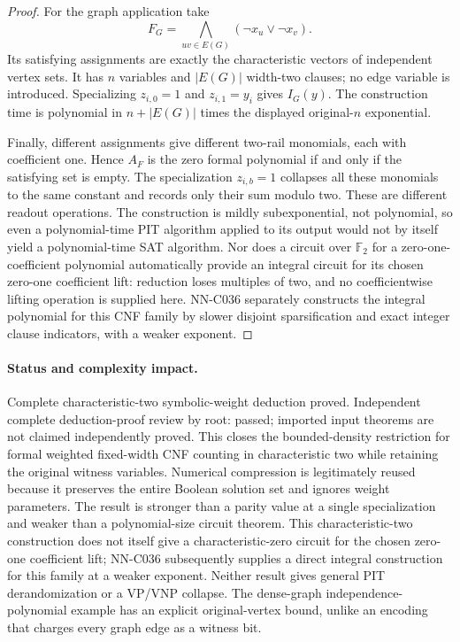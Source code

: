 \begin{proof}
For the graph application take
\[
                         F_G=\bigwedge_{uv\in E(G)}(\neg x_u\vee\neg x_v).
\]
Its satisfying assignments are exactly the characteristic vectors of independent vertex sets. It has $n$ variables and $|E(G)|$ width-two clauses; no edge variable is introduced. Specializing $z_{i,0}=1$ and $z_{i,1}=y_i$ gives $I_G(y)$. The construction time is polynomial in $n+|E(G)|$ times the displayed original-$n$ exponential.

Finally, different assignments give different two-rail monomials, each with coefficient one. Hence $A_F$ is the zero formal polynomial if and only if the satisfying set is empty. The specialization $z_{i,b}=1$ collapses all these monomials to the same constant and records only their sum modulo two. These are different readout operations. The construction is mildly subexponential, not polynomial, so even a polynomial-time PIT algorithm applied to its output would not by itself yield a polynomial-time SAT algorithm. Nor does a circuit over $\mathbb F_2$ for a zero-one-coefficient polynomial automatically provide an integral circuit for its chosen zero-one coefficient lift: reduction loses multiples of two, and no coefficientwise lifting operation is supplied here. NN-C036 separately constructs the integral polynomial for this CNF family by slower disjoint sparsification and exact integer clause indicators, with a weaker exponent.
\end{proof}
\paragraph{Status and complexity impact.}
Complete characteristic-two symbolic-weight deduction proved. Independent complete deduction-proof review by root: passed; imported input theorems are not claimed independently proved. This closes the bounded-density restriction for formal weighted fixed-width CNF counting in characteristic two while retaining the original witness variables. Numerical compression is legitimately reused because it preserves the entire Boolean solution set and ignores weight parameters. The result is stronger than a parity value at a single specialization and weaker than a polynomial-size circuit theorem. This characteristic-two construction does not itself give a characteristic-zero circuit for the chosen zero-one coefficient lift; NN-C036 subsequently supplies a direct integral construction for this family at a weaker exponent. Neither result gives general PIT derandomization or a VP/VNP collapse. The dense-graph independence-polynomial example has an explicit original-vertex bound, unlike an encoding that charges every graph edge as a witness bit.

